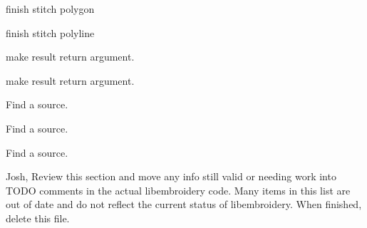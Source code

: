 \begin{DoxyRefList}
%
finish stitch polygon  
\item[Member \mbox{\hyperlink{fill_8c_a9ae9d5d7dfbb2ab361dc37970b7eb2f2}{emb\+Pattern\+\_\+stitch\+Polyline}} (Emb\+Pattern $\ast$p, Emb\+Polyline polyline, int thread\+\_\+index, int style)]\label{todo__todo000215}%
%
finish stitch polyline  
\item[Member \mbox{\hyperlink{vector_8c_a0a4af07bfac410623cf77a35a11550b1}{emb\+Vector\+\_\+multiply}} (Emb\+Vector vector, Emb\+Real magnitude, Emb\+Vector $\ast$result)]\label{todo__todo000231}%
%
make result return argument.  
\item[Member \mbox{\hyperlink{vector_8c_aaad72d90c58592e330de08139aee5077}{emb\+Vector\+\_\+normalize}} (Emb\+Vector vector, Emb\+Vector $\ast$result)]\label{todo__todo000230}%
%
make result return argument.  
\item[File \mbox{\hyperlink{format__art_8c}{format\+\_\+art.c}} ]\label{todo__todo000232}%
%
Find a source.  
\item[File \mbox{\hyperlink{format__bmc_8c}{format\+\_\+bmc.c}} ]\label{todo__todo000233}%
%
Find a source.  
\item[File \mbox{\hyperlink{format__cnd_8c}{format\+\_\+cnd.c}} ]\label{todo__todo000234}%
%
Find a source.  
\item[Page \mbox{\hyperlink{formats}{Formats}} ]\label{todo__todo000190}%
%
Josh, Review this section and move any info still valid or needing work into TODO comments in the actual libembroidery code. Many items in this list are out of date and do not reflect the current status of libembroidery. When finished, delete this file.


\end{DoxyRefList}
